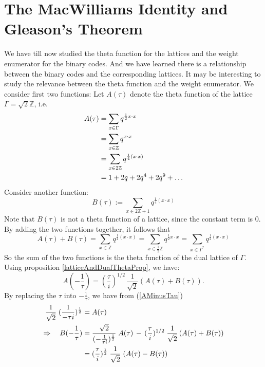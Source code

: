 \documentclass{article}
\numberwithin{equation}{theorem}
\numberwithin{figure}{theorem}
\newcommand{\Integer}{\ensuremath{\mathbb{Z}}}
\newcommand{\imaginary}{\ensuremath{i}}
\begin{document}
\section{The MacWilliams Identity and Gleason's Theorem}\label{sectionMacWill}
We have till now studied the theta function for the lattices and the weight enumerator for the binary codes. And we have learned there is a relationship between the binary codes and the corresponding lattices. It may be interesting to study the relevance between the theta function and the weight enumerator.
We consider first two functions:
Let $A(\tau)$ denote the theta function of the lattice $\Gamma = \sqrt{2}\Integer$, i.e.
	\begin{align}
	A(\tau) &= \sum_{x \in \Gamma}q^{\frac{1}{2}x\cdot x} \notag\\
			&= \sum_{x \in \Integer}q^{x\cdot x} \notag\\
			&= \sum_{x \in 2\Integer}q^{\frac{1}{4}(x\cdot x)}\label{Afunc}\\
			&= 1 + 2q + 2q^4 + 2q^9 + \ldots \notag
	\end{align}
Consider another function:
\begin{equation}\label{Bfunc}
	B(\tau) := \sum_{x \in 2\Integer + 1}q^{\frac{1}{4}(x\cdot x)}
\end{equation}
Note that $B(\tau)$ is not a theta function of a lattice, since the constant term is 0.
By adding the two functions together, it follows that
\begin{equation}\label{sumABfuncEq}
	A(\tau) + B(\tau) = \sum_{x \in \Integer}q^{\frac{1}{4}(x\cdot x)} = \sum_{x \in \frac{1}{2}\Integer}q^{\frac{1}{2}x \cdot x}
			= \sum_{x\in \Gamma^{*}}q^{\frac{1}{2}(x\cdot x)}
\end{equation}
So the sum of the two functions is the theta function of the dual lattice of $\Gamma$. Using proposition \ref{latticeAndDualThetaProp}, we have:
\begin{equation}\label{AMinusTau}
	A(-\frac{1}{\tau}) = (\frac{\tau}{\imaginary})^{1/2} \, \frac{1}{\sqrt{2}}(A(\tau) + B(\tau)).
\end{equation}
By replacing the $\tau$ into $-\frac{1}{\tau}$, we have from (\ref{AMinusTau})
\begin{align}
	[A(-\frac{1}{\tau}) + B(-\frac{1}{\tau})]\; \frac{1}{\sqrt{2}}\; (\frac{1}{-\tau \imaginary})^{\frac{1}{2}} &= A(\tau) \notag \\
	\Rightarrow \quad B(-\frac{1}{\tau}) &= \frac{\sqrt{2}}{(-\frac{1}{\tau \imaginary})^{\frac{1}{2}}} \; A(\tau) \,- \,(\frac{\tau}{\imaginary})^{1/2} \; \frac{1}{\sqrt{2}}\,(A(\tau) + B(\tau))\notag\\
	&= (\frac{\tau}{\imaginary})^{\frac{1}{2}} \;\frac{1}{\sqrt{2}}\;(A(\tau) - B(\tau)) \label{BMinusTau}
\end{align}
\end{document}
